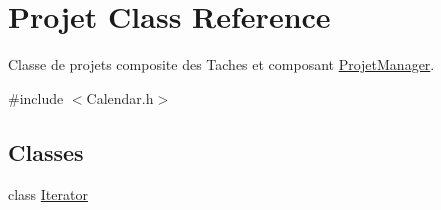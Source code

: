 \hypertarget{class_projet}{}\section{Projet Class Reference}
\label{class_projet}


Classe de projets composite des Taches et composant \hyperlink{class_projet_manager}{Projet\+Manager}.  




{\ttfamily \#include $<$Calendar.\+h$>$}

\subsection*{Classes}
\begin{DoxyCompactItemize}
\item 
class \hyperlink{class_projet_1_1_iterator}{Iterator}
\end{DoxyCompactItemize}
